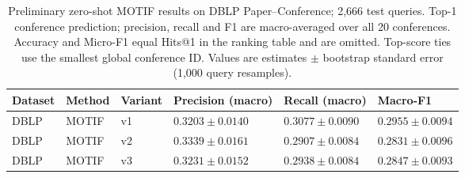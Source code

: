 \begin{table}[htbp]
\centering
\small
\renewcommand{\arraystretch}{1.15}
\setlength{\tabcolsep}{5pt}
\begin{adjustbox}{max width=\linewidth}
\begin{tabular}{|l|l|l|l|l|l|}
\hline
\textbf{Dataset} & \textbf{Method} & \textbf{Variant} & \textbf{Precision (macro)} & \textbf{Recall (macro)} & \textbf{Macro-F1} \\
\hline
DBLP & MOTIF & v1 & $0.3203 \pm 0.0140$ & $0.3077 \pm 0.0090$ & $0.2955 \pm 0.0094$ \\
\hline
DBLP & MOTIF & v2 & $0.3339 \pm 0.0161$ & $0.2907 \pm 0.0084$ & $0.2831 \pm 0.0096$ \\
\hline
DBLP & MOTIF & v3 & $0.3231 \pm 0.0152$ & $0.2938 \pm 0.0084$ & $0.2847 \pm 0.0093$ \\
\hline
\end{tabular}
\end{adjustbox}
\caption{Preliminary zero-shot MOTIF results on DBLP Paper--Conference; 2,666 test queries. Top-1 conference prediction; precision, recall and F1 are macro-averaged over all 20 conferences. Accuracy and Micro-F1 equal Hits@1 in the ranking table and are omitted. Top-score ties use the smallest global conference ID. Values are estimates $\pm$ bootstrap standard error (1,000 query resamples).}
\label{tab:motif-dblp-paper-conference-conference_prediction}
\end{table}

